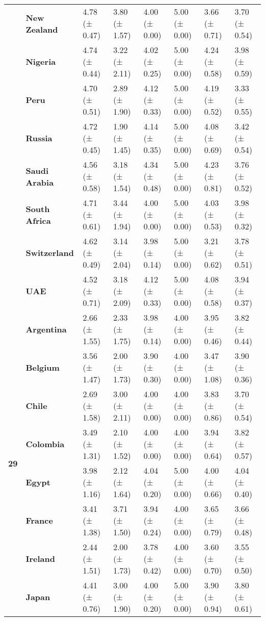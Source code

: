 \begin{longtable}{llllllll}
\textbf{} & \textbf{New Zealand} & 4.78 (± 0.47) & 3.80 (± 1.57) & 4.00 (± 0.00) & 5.00 (± 0.00) & 3.66 (± 0.71) & 3.70 (± 0.54) \\
\textbf{} & \textbf{Nigeria} & 4.74 (± 0.44) & 3.22 (± 2.11) & 4.02 (± 0.25) & 5.00 (± 0.00) & 4.24 (± 0.58) & 3.98 (± 0.59) \\
\textbf{} & \textbf{Peru} & 4.70 (± 0.51) & 2.89 (± 1.90) & 4.12 (± 0.33) & 5.00 (± 0.00) & 4.19 (± 0.52) & 3.33 (± 0.55) \\
\textbf{} & \textbf{Russia} & 4.72 (± 0.45) & 1.90 (± 1.45) & 4.14 (± 0.35) & 5.00 (± 0.00) & 4.08 (± 0.69) & 3.42 (± 0.54) \\
\textbf{} & \textbf{Saudi Arabia} & 4.56 (± 0.58) & 3.18 (± 1.54) & 4.34 (± 0.48) & 5.00 (± 0.00) & 4.23 (± 0.81) & 3.76 (± 0.52) \\
\textbf{} & \textbf{South Africa} & 4.71 (± 0.61) & 3.44 (± 1.94) & 4.00 (± 0.00) & 5.00 (± 0.00) & 4.03 (± 0.53) & 3.98 (± 0.32) \\
\textbf{} & \textbf{Switzerland} & 4.62 (± 0.49) & 3.14 (± 2.04) & 3.98 (± 0.14) & 5.00 (± 0.00) & 3.21 (± 0.62) & 3.78 (± 0.51) \\
\textbf{} & \textbf{UAE} & 4.52 (± 0.71) & 3.18 (± 2.09) & 4.12 (± 0.33) & 5.00 (± 0.00) & 4.08 (± 0.58) & 3.94 (± 0.37) \\
\cline{1-8}
\multirow[t]{19}{*}{\textbf{29}} & \textbf{Argentina} & 2.66 (± 1.55) & 2.33 (± 1.75) & 3.98 (± 0.14) & 4.00 (± 0.00) & 3.95 (± 0.46) & 3.82 (± 0.44) \\
\textbf{} & \textbf{Belgium} & 3.56 (± 1.47) & 2.00 (± 1.73) & 3.90 (± 0.30) & 4.00 (± 0.00) & 3.47 (± 1.08) & 3.90 (± 0.36) \\
\textbf{} & \textbf{Chile} & 2.69 (± 1.58) & 3.00 (± 2.11) & 4.00 (± 0.00) & 4.00 (± 0.00) & 3.83 (± 0.86) & 3.70 (± 0.54) \\
\textbf{} & \textbf{Colombia} & 3.49 (± 1.31) & 2.10 (± 1.52) & 4.00 (± 0.00) & 4.00 (± 0.00) & 3.94 (± 0.64) & 3.82 (± 0.57) \\
\textbf{} & \textbf{Egypt} & 3.98 (± 1.16) & 2.12 (± 1.64) & 4.04 (± 0.20) & 5.00 (± 0.00) & 4.00 (± 0.66) & 4.04 (± 0.40) \\
\textbf{} & \textbf{France} & 3.41 (± 1.38) & 3.71 (± 1.50) & 3.94 (± 0.24) & 4.00 (± 0.00) & 3.65 (± 0.79) & 3.66 (± 0.48) \\
\textbf{} & \textbf{Ireland} & 2.44 (± 1.51) & 2.00 (± 1.73) & 3.78 (± 0.42) & 4.00 (± 0.00) & 3.60 (± 0.70) & 3.55 (± 0.50) \\
\textbf{} & \textbf{Japan} & 4.41 (± 0.76) & 3.00 (± 1.90) & 4.00 (± 0.20) & 5.00 (± 0.00) & 3.90 (± 0.94) & 3.80 (± 0.61) \\

\end{longtable}
